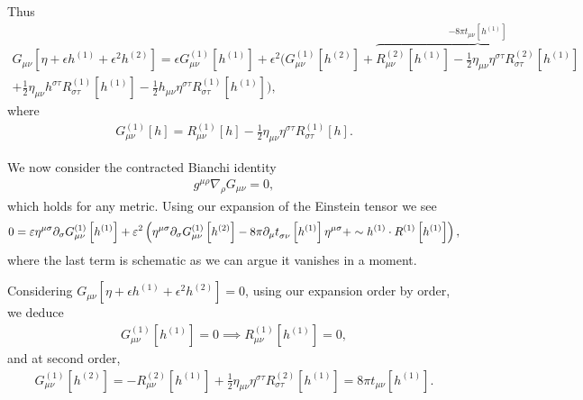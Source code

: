 Thus
\begin{align}
    G_{\mu \nu} \left[ \eta + \epsilon h^{\left( 1 \right) } + \epsilon^2 h^{\left( 2 \right) } \right]  = \epsilon G^{\left( 1 \right) }_{\mu \nu} \left[ h^{\left( 1 \right) } \right] + \epsilon^2 \bigg( G^{\left( 1 \right) }_{\mu \nu}\left[ h^{\left( 2 \right) } \right] + \overbrace{R^{\left( 2 \right) }_{\mu \nu} \left[ h^{\left( 1 \right) } \right] - \frac{1}{2} \eta_{\mu \nu} \eta^{\sigma \tau} R^{\left( 2 \right) }_{\sigma \tau} \left[ h^{\left( 1 \right) } \right]}^{-8\pi t_{\mu \nu}\left[ h^{\left( 1 \right) } \right] } \nonumber \\
    + \frac{1}{2} \eta_{\mu \nu} h^{\sigma \tau} R^{\left( 1 \right) }_{\sigma \tau}\left[ h^{\left( 1 \right) } \right] - \frac{1}{2}h_{\mu \nu} \eta^{\sigma \tau} R^{\left( 1 \right) }_{\sigma \tau} \left[ h^{\left( 1 \right) } \right]      \bigg) 
,\end{align}
where
\begin{align}
    G_{\mu \nu}^{\left( 1 \right) }\left[ h \right] = R^{\left( 1 \right) }_{\mu \nu}\left[ h \right] - \frac{1}{2}\eta_{\mu \nu} \eta^{\sigma \tau} R_{\sigma \tau}^{\left( 1 \right) }\left[ h \right] 
.\end{align}

We now consider the contracted Bianchi identity
\begin{align}
    g^{\mu \rho} \nabla_\rho G_{\mu \nu} = 0
,\end{align}
which holds for any metric. Using our expansion of the Einstein tensor we see
\begin{align}\label{eq:contracted_bianchi_expansion}
    0 = \epsilon \eta^{\mu \sigma} \partial_\sigma G^{\left( 1 \right) }_{\mu \nu}\left[ h^{\left( 1 \right) } \right] + \epsilon^2 \left( \eta^{\mu \sigma} \partial_\sigma G^{\left( 1 \right) }_{\mu \nu} \left[ h^{\left( 2 \right) } \right] - 8\pi \partial_\mu \tensor{t}{_{\sigma \nu}} \left[ h^{\left( 1 \right) } \right] \eta^{\mu \sigma} + \sim h^{\left( 1 \right) } \cdot R^{\left( 1 \right) }\left[ h^{\left( 1 \right) } \right]   \right) 
,\end{align}
where the last term is schematic as we can argue it vanishes in a moment.

Considering $G_{\mu \nu}\left[ \eta + \epsilon h^{\left( 1 \right) } + \epsilon^2 h^{\left( 2 \right) } \right] =0$, using our expansion order by order, we deduce
\begin{align}
    G^{\left( 1 \right) }_{\mu \nu}\left[ h^{\left( 1 \right) } \right] = 0 \implies R^{\left( 1 \right) }_{\mu \nu} \left[ h^{\left( 1 \right) } \right] = 0
,\end{align}
and at second order,
\begin{align}
    G^{\left( 1 \right) }_{\mu \nu}\left[ h^{\left( 2 \right) } \right]  = -R^{\left( 2 \right) }_{\mu \nu} \left[ h^{\left( 1 \right) } \right]  + \frac{1}{2} \eta_{\mu \nu} \eta^{\sigma \tau} R^{\left( 2 \right) }_{\sigma \tau} \left[ h^{\left( 1 \right) } \right]  = 8 \pi t_{\mu \nu}\left[ h^{\left( 1 \right) } \right] 
.\end{align}

